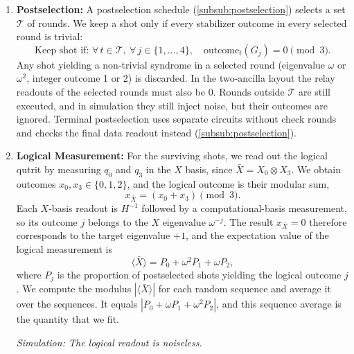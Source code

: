 \begin{enumerate}
    \item \textbf{Postselection:} A postselection schedule (\autoref{subsub:postselection}) selects a set $\mathcal{T}$ of rounds. We keep a shot only if every stabilizer outcome in every selected round is trivial:
    \begin{equation}
        \text{Keep shot if: } \forall\, t \in \mathcal{T},\ \forall\, j \in \{1, \dots, 4\}, \quad \text{outcome}_t(G_j) = 0 \pmod 3 .
    \end{equation}
    Any shot yielding a non-trivial syndrome in a selected round (eigenvalue $\omega$ or $\omega^2$, integer outcome 1 or 2) is discarded. In the two-ancilla layout the relay readouts of the selected rounds must also be $0$. Rounds outside $\mathcal{T}$ are still executed, and in simulation they still inject noise, but their outcomes are ignored. Terminal postselection uses separate circuits without check rounds and checks the final data readout instead (\autoref{subsub:postselection}).

    \item \textbf{Logical Measurement:} For the surviving shots, we read out the logical qutrit by measuring $q_0$ and $q_3$ in the $X$ basis, since $\bar{X} = X_0 \otimes X_3$. We obtain outcomes $x_0, x_3 \in \{0, 1, 2\}$, and the logical outcome is their modular sum,
    \begin{equation}
        x_{\bar{X}} = (x_0 + x_3) \pmod 3 .
    \end{equation}
    Each $X$-basis readout is $H^{-1}$ followed by a computational-basis measurement, so its outcome $j$ belongs to the $X$ eigenvalue $\omega^{-j}$. The result $x_{\bar{X}}=0$ therefore corresponds to the target eigenvalue $+1$, and the expectation value of the logical measurement is
    \begin{equation}
        \langle \bar{X} \rangle = P_0 + \omega^{2} P_1 + \omega P_2,
    \end{equation}
    where $P_j$ is the proportion of postselected shots yielding the logical outcome $j$. We compute the modulus $|\langle \bar{X} \rangle|$ for each random sequence and average it over the sequences. It equals $|P_0 + \omega P_1 + \omega^2 P_2|$, and this sequence average is the quantity that we fit.

    \textit{Simulation: The logical readout is noiseless.}
\end{enumerate}

